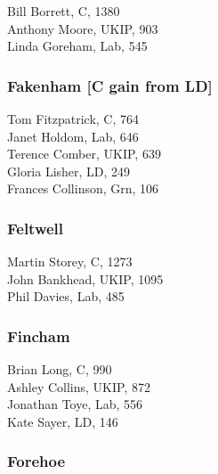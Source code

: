 \documentclass[a4paper,openany,10pt]{book}
\begin{document}
Bill Borrett, C, 1380\\
Anthony Moore, UKIP, 903\\
Linda Goreham, Lab, 545\\


\subsubsection*{Fakenham \hspace*{\fill}\nolinebreak[1]%
\enspace\hspace*{\fill}
[C gain from LD]}



Tom Fitzpatrick, C, 764\\
Janet Holdom, Lab, 646\\
Terence Comber, UKIP, 639\\
Gloria Lisher, LD, 249\\
Frances Collinson, Grn, 106\\


\subsubsection*{Feltwell}



Martin Storey, C, 1273\\
John Bankhead, UKIP, 1095\\
Phil Davies, Lab, 485\\


\subsubsection*{Fincham}



Brian Long, C, 990\\
Ashley Collins, UKIP, 872\\
Jonathan Toye, Lab, 556\\
Kate Sayer, LD, 146\\


\subsubsection*{Forehoe}

\end{document}
